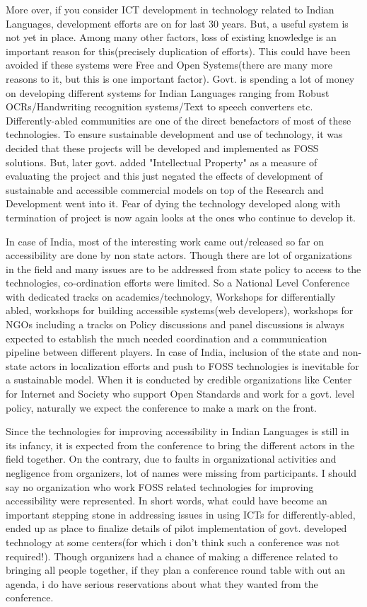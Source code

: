 More over, if you consider ICT development in technology related to Indian Languages, development efforts are on for last 30 years. But, a useful system is not yet in place. Among many other factors, loss of existing knowledge is an important reason for this(precisely duplication of efforts). This could have been avoided if these systems were Free and Open Systems(there are many more reasons to it, but this is one important factor). Govt. is spending a lot of money on developing different systems for Indian Languages ranging from Robust OCRs/Handwriting recognition systems/Text to speech converters etc. Differently-abled communities are one of the direct benefactors of most of these technologies. To ensure sustainable development and use of technology, it was decided that these projects will be developed and implemented as FOSS solutions. But, later govt. added "Intellectual Property" as a measure of evaluating the project and this just negated the effects of development of sustainable and accessible commercial models on top of the Research and Development went into it. Fear of dying the technology developed along with termination of project is now again looks at the ones who continue to develop it. 

In case of India, most of the interesting work came out/released so far on accessibility are done by non state actors. Though there are lot of organizations in the field and many issues are to be addressed from state policy to access to the technologies, co-ordination efforts were limited. So a National Level Conference with dedicated tracks on academics/technology, Workshops for differentially abled, workshops for building accessible systems(web developers), workshops for NGOs including a tracks on Policy discussions and panel discussions is always expected to establish the much needed coordination and a communication pipeline between different players. In case of India, inclusion of the state and non-state actors in localization efforts and push to FOSS technologies is inevitable for a sustainable model. When it is conducted by credible organizations like Center for Internet and Society who support Open Standards and work for a govt. level policy, naturally we expect the conference to make a mark on the front. 

Since the technologies for improving accessibility in Indian Languages is still in its infancy, it is expected from the conference to bring the different actors in the field together. On the contrary, due to faults in organizational activities and negligence from organizers, lot of names were missing from participants. I should say no organization who work FOSS related technologies for improving accessibility were represented. In short words, what could have become an important stepping stone in addressing issues in using ICTs for differently-abled, ended up as place to finalize details of pilot implementation of govt. developed technology at some centers(for which i don't think such a conference was not required!). Though organizers had a chance of making a difference related to bringing all people together, if they plan a conference round table with out an agenda, i do have serious reservations about what they wanted from the conference.

